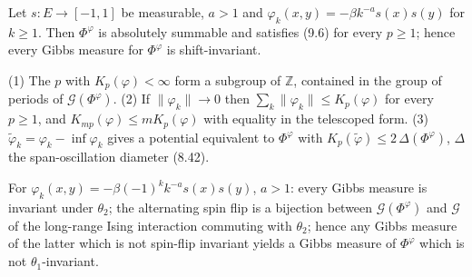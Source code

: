 \begin{example}[Georgii (9.8)(1)]
    \label{ex:sb-9-8-1}
    \leanok

    Let $s \colon E \to [-1,1]$ be measurable, $a > 1$ and $\varphi_k(x,y) = -\beta k^{-a} s(x)s(y)$
    for $k \geq 1$. Then $\Phi^\varphi$ is absolutely summable and satisfies (9.6) for every
    $p \geq 1$; hence every Gibbs measure for $\Phi^\varphi$ is shift-invariant.
\end{example}

\begin{remark}[Georgii (9.7)]
    \label{rmk:sb-9-7}
    \leanok

    (1) The $p$ with $K_p(\varphi) < \infty$ form a subgroup of $\mathbb Z$, contained in the
    group of periods of $\mathcal G(\Phi^\varphi)$. (2) If $\|\varphi_k\| \to 0$ then
    $\sum_k \|\varphi_k\| \leq K_p(\varphi)$ for every $p \geq 1$, and $K_{mp}(\varphi) \leq m K_p(\varphi)$
    with equality in the telescoped form. (3) $\tilde\varphi_k = \varphi_k - \inf\varphi_k$ gives
    a potential equivalent to $\Phi^\varphi$ with $K_p(\tilde\varphi) \leq 2\,\Delta(\Phi^\varphi)$,
    $\Delta$ the span-oscillation diameter (8.42).
\end{remark}

\begin{example}[Georgii (9.8)(2)]
    \label{ex:sb-9-8-2}
    \leanok

    For $\varphi_k(x,y) = -\beta (-1)^k k^{-a} s(x)s(y)$, $a > 1$: every Gibbs measure is
    invariant under $\theta_2$; the alternating spin flip is a bijection between
    $\mathcal G(\Phi^{\varphi})$ and $\mathcal G$ of the long-range Ising interaction commuting
    with $\theta_2$; hence any Gibbs measure of the latter which is not spin-flip invariant yields
    a Gibbs measure of $\Phi^\varphi$ which is not $\theta_1$-invariant.
\end{example}

